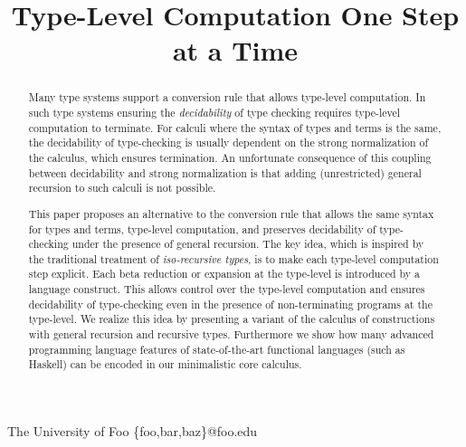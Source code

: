 \documentclass[preprint]{sigplanconf}
\begin{document}


\preprintfooter{} %

\title{Type-Level Computation One Step at a Time}

           {The University of Foo}
           {\{foo,bar,baz\}@foo.edu}

\maketitle

\begin{abstract}
Many type systems support a conversion rule that allows type-level
computation. In such type systems ensuring the \emph{decidability} of
type checking requires type-level computation to terminate.
For calculi where the syntax of types and terms is the same, the
decidability of type-checking is usually dependent on the strong normalization
of the calculus, which ensures termination. An unfortunate
consequence of this coupling between decidability and strong
normalization is that adding (unrestricted) general recursion to such
calculi is not possible.

This paper proposes an alternative to the conversion rule that allows
the same syntax for types and terms, type-level computation, and
preserves decidability of type-checking under the presence of general
recursion. The key idea, which is inspired by the traditional
treatment of \emph{iso-recursive types}, is to make each type-level
computation step explicit. Each beta reduction or expansion at the
type-level is introduced by a language construct. This allows control
over the type-level computation and ensures decidability of
type-checking even in the presence of non-terminating programs at the
type-level.  We realize this idea by presenting a variant of the
calculus of constructions with general recursion and recursive types.
Furthermore we show how many advanced programming language features of
state-of-the-art functional languages (such as Haskell) can be encoded
in our minimalistic core calculus.
\end{abstract}
\end{document}
